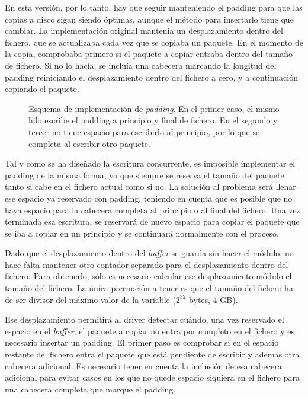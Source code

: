 \documentclass[oneside, draft]{epstfg}
\begin{document}
En esta versión, por lo tanto, hay que seguir manteniendo el \gls{padding} para que las copias a disco sigan siendo óptimas, aunque el método para insertarlo tiene que cambiar. La implementación original mantenía un desplazamiento dentro del fichero, que se actualizaba cada vez que se copiaba un paquete. En el momento de la copia, comprobaba primero si el paquete a copiar entraba dentro del tamaño de fichero. Si no lo hacía, se incluía una cabecera marcando la longitud del \gls{padding} reiniciando el desplazamiento dentro del fichero a cero, y a continuación copiando el paquete.

\begin{figure}[tbp]
\centering

\caption[Esquema de implementación del \textit{padding} en el \textit{buffer} intermedio]{Esquema de implementación de \textit{padding}. En el primer caso, el mismo hilo escribe el \gls{padding} a principio y final de fichero. En el segundo y tercer no tiene espacio para escribirlo al principio, por lo que se completa al escribir otro paquete.}
\label{fig:BufferPadding}
\end{figure}

Tal y como se ha diseñado la escritura concurrente, es imposible implementar el \gls{padding} de la misma forma, ya que siempre se reserva el tamaño del paquete tanto si cabe en el fichero actual como si no. La solución al problema será llenar ese espacio ya reservado con \gls{padding}, teniendo en cuenta que es posible que no haya espacio para la cabecera completa al principio o al final del fichero. Una vez terminada esa escritura, se reservará de nuevo espacio para copiar el paquete que se iba a copiar en un principio y se continuará normalmente con el proceso.

Dado que el desplazamiento dentro del \textit{buffer} se guarda sin hacer el módulo, no hace falta mantener otro contador separado para el desplazamiento dentro del fichero. Para obtenerlo, sólo es necesario calcular ese desplazamiento módulo el tamaño del fichero. La única precaución a tener es que el tamaño del fichero ha de ser divisor del máximo valor de la variable ($2^{32}$ bytes, 4 GB).

Ese desplazamiento permitirá al \gls{driver} detectar cuándo, una vez reservado el espacio en el \textit{buffer}, el paquete a copiar no entra por completo en el fichero y es necesario insertar un \gls{padding}. El primer paso es comprobar si en el espacio restante del fichero entra el paquete que está pendiente de escribir y además otra cabecera adicional. Es necesario tener en cuenta la inclusión de esa cabecera adicional para evitar casos en los que no quede espacio siquiera en el fichero para una cabecera completa que marque el \gls{padding}.
\end{document}
